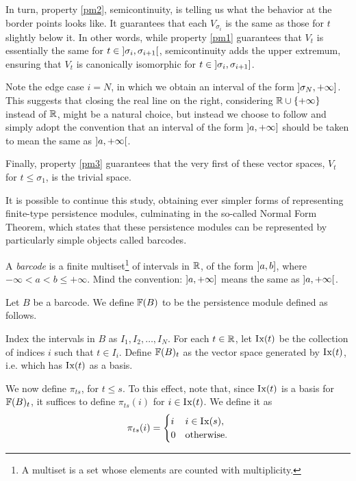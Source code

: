 In turn, property \ref{pm2}, semicontinuity, is telling us what the behavior at the border points looks like. It guarantees that each $V_{\sigma_i}$ is the same as those for $t$ slightly below it. In other words, while property \ref{pm1} guarantees that $V_t$ is essentially the same for $t \in \ointerval{\sigma_i}{\sigma_{i+1}}$, semicontinuity adds the upper extremum, ensuring that $V_t$ is canonically isomorphic for $t \in \linterval{\sigma_i}{\sigma_{i+1}}$.

Note the edge case $i = N$, in which we obtain an interval of the form $\linterval{\sigma_N}{+\infty}$. This suggests that closing the real line on the right, considering $\mathbb{R} \cup \{+\infty\}$ instead of $\mathbb{R}$, might be a natural choice, but instead we choose to follow \cite{polterovich} and simply adopt the convention that an interval of the form $\linterval{a}{+\infty}$ should be taken to mean the same as $\ointerval{a}{+\infty}$.

Finally, property \ref{pm3} guarantees that the very first of these vector spaces, $V_t$ for $t \leq \sigma_1$, is the trivial space.

It is possible to continue this study, obtaining ever simpler forms of representing finite-type persistence modules, culminating in the so-called Normal Form Theorem, which states that these persistence modules can be represented by particularly simple objects called barcodes.

\begin{definition}
A \emph{barcode} is a finite multiset\footnote{A multiset is a set whose elements are counted with multiplicity.} of intervals in $\mathbb{R}$, of the form $\linterval a b$, where $-\infty < a < b \leq +\infty$. Mind the convention: $\linterval a {+\infty}$ means the same as $\ointerval a {+\infty}$.
\end{definition}

\begin{definition}\label{def:pmfrombarcode}
Let $B$ be a barcode. We define $\mathbb{F}(B)$ to be the persistence module defined as follows.

Index the intervals in $B$ as $I_1, I_2, \dots, I_N$. For each $t \in \mathbb{R}$, let $\mathop{\mathrm{I\mkern0.7mu x}}(t)$ be the collection of indices $i$ such that $t \in I_i$. Define $\mathbb{F}(B)_t$ as the vector space generated by $\mathop{\mathrm{I\mkern0.7mu x}}(t)$, i.e. which has $\mathop{\mathrm{I\mkern0.7mu x}}(t)$ as a basis.

We now define $\pi_{ts}$, for $t \leq s$. To this effect, note that, since $\mathop{\mathrm{I\mkern0.7mu x}}(t)$ is a basis for $\mathbb{F}(B)_t$, it suffices to define $\pi_{ts}(i)$ for $i \in \mathop{\mathrm{I\mkern0.7mu x}}(t)$. We define it as
\begin{equation}
\pi_{ts}(i) = \begin{cases} i & i \in \mathop{\mathrm{I\mkern0.7mu x}}(s),\\ 0 & \text{otherwise}. \end{cases}
\end{equation}
\end{definition}

